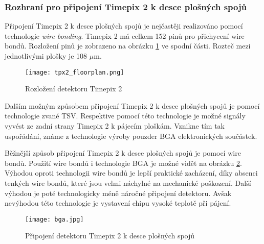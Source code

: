 \subsubsection{Rozhraní pro připojení Timepix 2 k desce plošných spojů}	%
Připojení Timepix 2 k desce plošných spojů je nejčastěji realizováno pomocí technologie \textit{wire bonding}. Timepix 2 má celkem 152 pinů pro přichycení wire bondů. Rozložení pinů je zobrazeno na obrázku \ref{fig:tpx2_floorplan} ve spodní části. Rozteč mezi jednotlivými plošky je 108 $\mu$m.
\begin{figure}[h!]
	\centering
	\captionsetup{justification=centering}
	\texttt{[image: tpx2\_floorplan.png]}
	\caption{Rozložení detektoru Timepix 2 \cite{tpx2_manual}} 
	\label{fig:tpx2_floorplan}
\end{figure}	
Dalším možným způsobem připojení Timepix 2 k desce plošných spojů je pomocí technologie zvané TSV. Respektive pomocí této technologie je možné signály vyvést ze zadní strany Timepix 2 k pájecím ploškám. Vznikne tím tak uspořádání, známe z technologie výroby pouzder BGA elektronických součástek. 
\par Běžnější způsob připojení Timepix 2 k desce plošných spojů je pomocí wire bondů. Použití wire bondů i technologie BGA je možné vidět na obrázku \ref{fig:bga}. Výhodou oproti technologii wire bondů je lepší praktické zacházení, díky absenci tenkých wire bondů, které jsou velmi náchylné na mechanické poškození. Další výhodou je poté technologicky méně náročné připojení detektoru. Avšak nevýhodou této technologie je vystavení chipu vysoké teplotě při pájení.
\begin{figure}[h!]
	\centering
	\captionsetup{justification=centering}
	\texttt{[image: bga.jpg]}
	\caption{Připojení detektoru Timepix 2 k desce plošných spojů \cite{TSV}} 
	\label{fig:bga}
\end{figure}	









